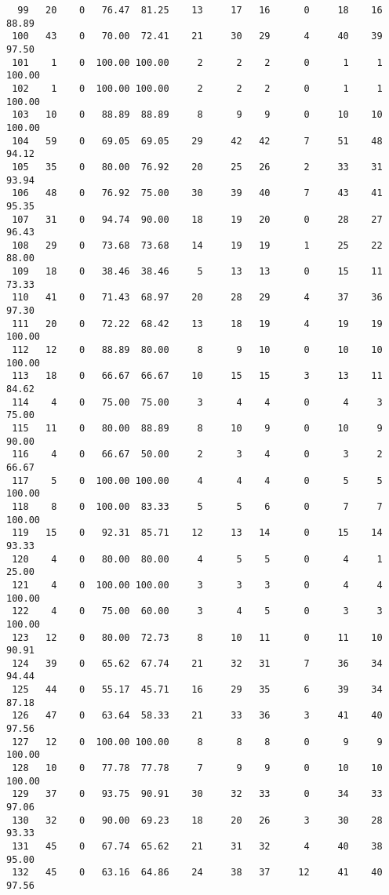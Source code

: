 \begin{verbatim}
  99   20    0   76.47  81.25    13     17   16      0     18    16    88.89
 100   43    0   70.00  72.41    21     30   29      4     40    39    97.50
 101    1    0  100.00 100.00     2      2    2      0      1     1   100.00
 102    1    0  100.00 100.00     2      2    2      0      1     1   100.00
 103   10    0   88.89  88.89     8      9    9      0     10    10   100.00
 104   59    0   69.05  69.05    29     42   42      7     51    48    94.12
 105   35    0   80.00  76.92    20     25   26      2     33    31    93.94
 106   48    0   76.92  75.00    30     39   40      7     43    41    95.35
 107   31    0   94.74  90.00    18     19   20      0     28    27    96.43
 108   29    0   73.68  73.68    14     19   19      1     25    22    88.00
 109   18    0   38.46  38.46     5     13   13      0     15    11    73.33
 110   41    0   71.43  68.97    20     28   29      4     37    36    97.30
 111   20    0   72.22  68.42    13     18   19      4     19    19   100.00
 112   12    0   88.89  80.00     8      9   10      0     10    10   100.00
 113   18    0   66.67  66.67    10     15   15      3     13    11    84.62
 114    4    0   75.00  75.00     3      4    4      0      4     3    75.00
 115   11    0   80.00  88.89     8     10    9      0     10     9    90.00
 116    4    0   66.67  50.00     2      3    4      0      3     2    66.67
 117    5    0  100.00 100.00     4      4    4      0      5     5   100.00
 118    8    0  100.00  83.33     5      5    6      0      7     7   100.00
 119   15    0   92.31  85.71    12     13   14      0     15    14    93.33
 120    4    0   80.00  80.00     4      5    5      0      4     1    25.00
 121    4    0  100.00 100.00     3      3    3      0      4     4   100.00
 122    4    0   75.00  60.00     3      4    5      0      3     3   100.00
 123   12    0   80.00  72.73     8     10   11      0     11    10    90.91
 124   39    0   65.62  67.74    21     32   31      7     36    34    94.44
 125   44    0   55.17  45.71    16     29   35      6     39    34    87.18
 126   47    0   63.64  58.33    21     33   36      3     41    40    97.56
 127   12    0  100.00 100.00     8      8    8      0      9     9   100.00
 128   10    0   77.78  77.78     7      9    9      0     10    10   100.00
 129   37    0   93.75  90.91    30     32   33      0     34    33    97.06
 130   32    0   90.00  69.23    18     20   26      3     30    28    93.33
 131   45    0   67.74  65.62    21     31   32      4     40    38    95.00
 132   45    0   63.16  64.86    24     38   37     12     41    40    97.56

\end{verbatim}
